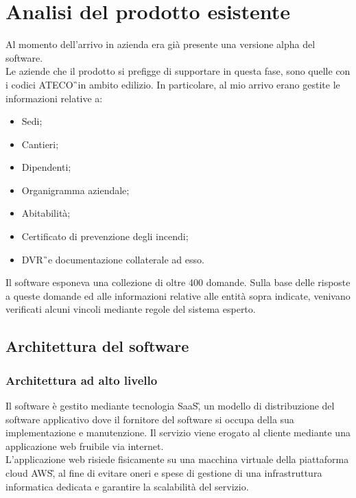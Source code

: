 \section{Analisi del prodotto esistente}

Al momento dell'arrivo in azienda era già presente una versione alpha del software. \\
Le aziende che il prodotto si prefigge di supportare in questa fase, sono quelle con i codici \gls{ATECO}\G\ in ambito edilizio. In particolare, al mio arrivo erano gestite le informazioni relative a:
\begin{itemize}
	\item Sedi;
	\item Cantieri;
	\item Dipendenti;
	\item Organigramma aziendale;
	\item Abitabilità;
	\item Certificato di prevenzione degli incendi;
	\item \gls{DVR}\G\ e documentazione collaterale ad esso.
\end{itemize}
Il software esponeva una collezione di oltre 400 domande. Sulla base delle risposte a queste domande ed alle informazioni relative alle entità sopra indicate, venivano verificati alcuni vincoli mediante regole del sistema esperto.

\subsection{Architettura del software}
\subsubsection{Architettura ad alto livello}
Il software è gestito mediante tecnologia \gls{SaaS}\G, un modello di distribuzione del software applicativo dove il fornitore del software si occupa della sua implementazione e manutenzione. Il servizio viene erogato al cliente mediante una applicazione web fruibile via internet. \\ 
L'applicazione web risiede fisicamente su una macchina virtuale della piattaforma cloud \gls{AWS}\G, al fine di evitare oneri e spese di gestione di una infrastruttura informatica dedicata e garantire la scalabilità del servizio.\\

